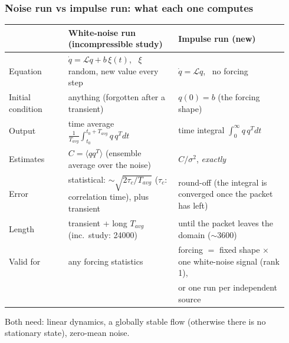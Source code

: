 \documentclass[
  aspectratio=169,
  t,
  onlytextwidth,
  10pt,
]{beamer}
\begin{document}
\begin{frame}
	\frametitle{Noise run vs impulse run: what each one computes}
	\footnotesize
	\renewcommand{\arraystretch}{1.25}
	\begin{tabular}{p{0.2\linewidth}p{0.37\linewidth}p{0.37\linewidth}}
		\toprule
		& \textbf{White-noise run} (incompressible study) & \textbf{Impulse run} (new) \\
		\midrule
		Equation & $\dot q = \mathcal{L}q + b\,\xi(t)$, \ $\xi$ random, new value every step & $\dot q = \mathcal{L}q$, \ no forcing \\
		Initial condition & anything (forgotten after a transient) & $q(0)=b$ (the forcing shape) \\
		Output & time average $\frac{1}{T_{avg}}\int_{t_0}^{t_0+T_{avg}} q\,q^T dt$ & time integral $\int_0^{\infty} q\,q^T dt$ \\
		Estimates & $C=\langle q q^T\rangle$ (ensemble average over the noise) & $C/\sigma^2$, \emph{exactly} \\
		Error & statistical: $\sim\sqrt{2\tau_c/T_{avg}}$ ($\tau_c$: correlation time), plus transient & round-off (the integral is converged once the packet has left) \\
		Length & transient + long $T_{avg}$ (inc.\ study: 24000) & until the packet leaves the domain ($\sim$3600) \\
		Valid for & any forcing statistics & forcing $= $ fixed shape $\times$ one white-noise signal (rank 1), \\
		& & or one run per independent source \\
		\bottomrule
	\end{tabular}
	\vspace{0.2cm}

	\small Both need: linear dynamics, a globally stable flow (otherwise there is no stationary state), zero-mean noise.
\end{frame}
\end{document}
